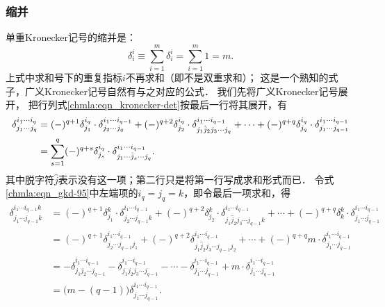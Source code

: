 \subsubsection{缩并}
单重Kronecker记号的缩并是： 
\begin{equation}\label{chmla:eqn_gkd-105}
    \delta_i^i \equiv \sum_{i=1}^{m} \delta_i^i = \sum_{i=1}^{m} 1 = m.
\end{equation}
上式中求和号下的重复指标$i$不再求和（即不是双重求和）；
这是一个熟知的式子，广义Kronecker记号自然有与之对应的公式．
我们先将广义Kronecker记号展开，
把行列式\eqref{chmla:eqn_kronecker-det}按最后一行将其展开，有
\begin{align}
    \delta_{j_1 \cdots j_q}^{i_1 \cdots i_q} &=
    (-)^{q+1}\delta_{j_1}^{i_q} \cdot \delta_{j_2 \cdots j_q}^{i_1 \cdots i_{q-1}}
    +(-)^{q+2}\delta_{j_2}^{i_q} \cdot \delta_{j_1 \hat{j}_2 j_3 \cdots j_q}^{i_1 \cdots i_{q-1}}
    +\cdots +
    (-)^{q+q}\delta_{j_q}^{i_q} \cdot \delta_{j_1 \cdots j_{q-1}}^{i_1 \cdots i_{q-1}}
    \notag \\
    &= \sum_{s=1}^{q} (-)^{q+s}\delta_{j_s}^{i_q} \cdot
    \delta_{j_1 \cdots \hat{j}_s \cdots j_q}^{i_1 \cdots i_{q-1}} . \label{chmla:eqn_gkd-95}
\end{align}
其中脱字符$\hat{j}$表示没有这一项；第二行只是将第一行写成求和形式而已．
令式\eqref{chmla:eqn_gkd-95}中左端项的$i_q=j_q=k$，即令最后一项求和，得
\begin{align*}
    \delta_{j_1 \cdots j_{q-1}k}^{i_1 \cdots i_{q-1}k} &=
    (-)^{q+1}\delta_{j_1}^{k} \cdot \delta_{j_2 \cdots j_{q-1}k}^{i_1 \cdots i_{q-1}}
    +(-)^{q+2}\delta_{j_2}^{k} \cdot \delta_{j_1 \hat{j}_2 j_3 \cdots j_{q-1}k}^{i_1 \cdots i_{q-1}}
    +\cdots +
    (-)^{q+q}\delta_{k}^{k} \cdot \delta_{j_1 \cdots j_{q-1}}^{i_1 \cdots i_{q-1}} \\
    &= (-)^{q+1}  \delta_{j_2 \cdots j_{q-1}j_1}^{i_1 \cdots i_{q-1}}
    +(-)^{q+2} \delta_{j_1 \hat{j}_2 j_3 \cdots j_{q-1} {j_2} }^{i_1 \cdots i_{q-1}}
    +\cdots + (-)^{q+q} m \cdot \delta_{j_1 \cdots j_{q-1}}^{i_1 \cdots i_{q-1}}  \\
    &= - \delta_{j_1j_2 \cdots j_{q-1}}^{i_1 \cdots i_{q-1}}
       - \delta_{j_1 {j}_2 j_3 \cdots j_{q-1}}^{i_1 \cdots i_{q-1}} -\cdots
       - \delta_{j_1 \cdots j_{q-1}}^{i_1 \cdots i_{q-1}}
       +  m \cdot \delta_{j_1 \cdots j_{q-1}}^{i_1 \cdots i_{q-1}}  \\
    & = \bigl(m-(q-1)\bigr)   \delta_{j_1 \cdots j_{q-1}}^{i_1 \cdots i_{q-1}} .
\end{align*}
